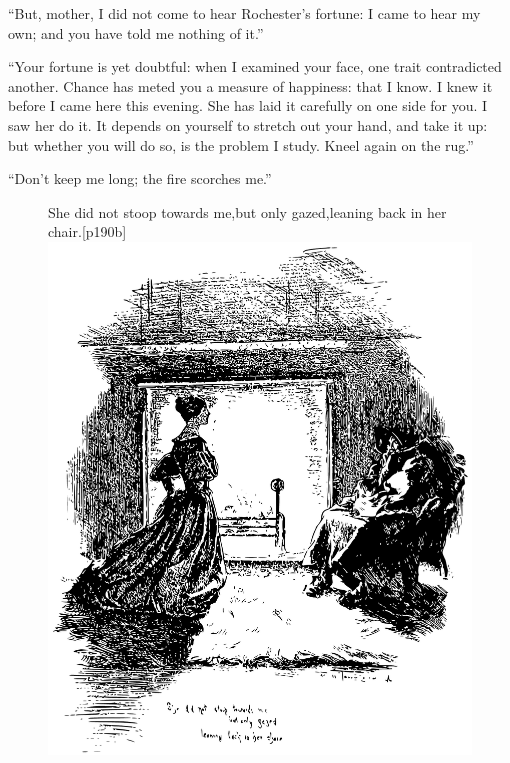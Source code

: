 \enquote{But, mother, I did not come to hear \Mr{} Rochester's fortune: I
	came to hear my own; and you have told me nothing of it.}

\enquote{Your fortune is yet doubtful: when I examined your face, one
	trait contradicted another. Chance has meted you a measure of
	happiness: that I know. I knew it before I came here this evening. She
	has laid it carefully on one side for you. I saw her do it. It depends
	on yourself to stretch out your hand, and take it up: but whether you
	will do so, is the problem I study. Kneel again on the rug.}

\enquote{Don't keep me long; the fire scorches me.}

\begin{figure}
	\begin{sidecaption}{She did not stoop towards me,\linebreak but only gazed,\linebreak leaning back in her chair.}[p190b]
		\centering
		\includegraphics[width=\linewidth]{images/p190b.pdf}
	\end{sidecaption}
\end{figure}

